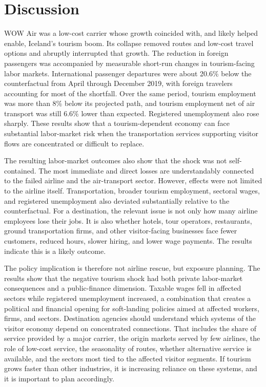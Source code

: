 \documentclass[12pt]{article}
\begin{document}
\clearpage

\section{Discussion}\label{sec:discussion}
WOW Air was a low-cost carrier whose growth coincided with, and likely helped enable, Iceland's tourism boom. Its collapse removed routes and low-cost travel options and abruptly interrupted that growth. The reduction in foreign passengers was accompanied by measurable short-run changes in tourism-facing labor markets. International passenger departures were about 20.6\% below the counterfactual from April through December 2019, with foreign travelers accounting for most of the shortfall. Over the same period, tourism employment was more than 8\% below its projected path, and tourism employment net of air transport was still 6.6\% lower than expected. Registered unemployment also rose sharply. These results show that a tourism-dependent economy can face substantial labor-market risk when the transportation services supporting visitor flows are concentrated or difficult to replace.

The resulting labor-market outcomes also show that the shock was not self-contained. The most immediate and direct losses are understandably connected to the failed airline and the air-transport sector. However, effects were not limited to the airline itself. Transportation, broader tourism employment, sectoral wages, and registered unemployment also deviated substantially relative to the counterfactual. For a destination, the relevant issue is not only how many airline employees lose their jobs. It is also whether hotels, tour operators, restaurants, ground transportation firms, and other visitor-facing businesses face fewer customers, reduced hours, slower hiring, and lower wage payments. The results indicate this is a likely outcome. 

The policy implication is therefore not airline rescue, but exposure planning. The results show that the negative tourism shock had both private labor-market consequences and a public-finance dimension. Taxable wages fell in affected sectors while registered unemployment increased, a combination that creates a political and financial opening for soft-landing policies aimed at affected workers, firms, and sectors. Destination agencies should understand which systems of the visitor economy depend on concentrated connections. That includes the share of service provided by a major carrier, the origin markets served by few airlines, the role of low-cost service, the seasonality of routes, whether alternative service is available, and the sectors most tied to the affected visitor segments. If tourism grows faster than other industries, it is increasing reliance on these systems, and it is important to plan accordingly. 
\end{document}
